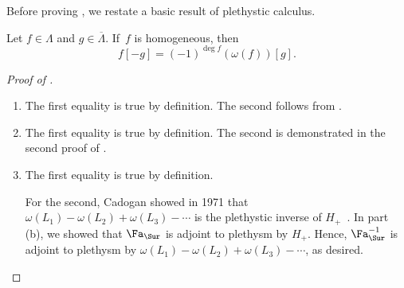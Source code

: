 Before proving , we restate a basic result of plethystic calculus.
\begin{lemma}\label{lemma:negation}
    Let $f \in \Lambda$ and $g \in \overline{\Lambda}$. If~$f$ is homogeneous, then \[f[-g] = (-1)^{\deg f} (\omega(f))[g].\]
\end{lemma}
\begin{proof}[Proof of ]
    \begin{enumerate}[label=(\alph*)]
        \item The first equality is true by definition. The second follows from .
        \item The first equality is true by definition. The second is demonstrated in the second proof of .
        \item The first equality is true by definition.
        
        For the second, Cadogan showed in 1971 that $\omega(L_1) - \omega(L_2) + \omega(L_3) - \cdots$ is the plethystic inverse of $H_+$~\cite{MR0284377}. In part (b), we showed that $\Fa_{\Sur}$ is adjoint to plethysm by $H_+$. Hence, $\Fa_{\Sur}^{-1}$ is adjoint to plethysm by $\omega(L_1) - \omega(L_2) + \omega(L_3) - \cdots$, as desired.


\end{enumerate}
\end{proof}
